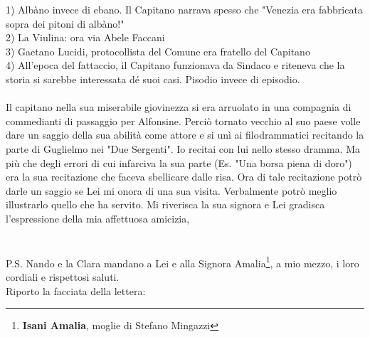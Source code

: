 {1) Albàno invece di ebano. Il Capitano narrava spesso che "Venezia era fabbricata sopra dei pitoni di albàno!"\\
2) La Viulina: ora via Abele Faccani\\
3) Gaetano Lucidi, protocollista del Comune era fratello del Capitano\\
4) All'epoca del fattaccio, il Capitano funzionava da Sindaco e riteneva che la storia si sarebbe interessata dé suoi casi. Pisodio invece di episodio. \\
\\
Il capitano nella sua miserabile giovinezza si era arruolato in una compagnia di commedianti di passaggio per Alfonsine. Perciò tornato vecchio al suo paese volle dare un saggio della sua abilità come attore e si unì ai filodrammatici recitando la parte di Guglielmo nei "Due Sergenti". Io recitai con lui nello stesso dramma. Ma più che degli errori di cui infarciva la sua parte (Es. "Una borsa piena di doro") era la sua recitazione che faceva sbellicare dalle risa. Ora di tale recitazione potrò darle un saggio se Lei mi onora di una sua visita. Verbalmente potrò meglio illustrarlo quello che ha servito. Mi riverisca la sua signora e Lei gradisca l'espressione della mia affettuosa amicizia,\\
\\\\P.S. Nando e la Clara mandano a Lei e alla Signora Amalia\footnote{\textbf{Isani Amalia}, moglie di Stefano Mingazzi}, a mio mezzo, i loro cordiali e rispettosi saluti.
}\\
\newpage
\noindent Riporto la facciata della lettera:\\
